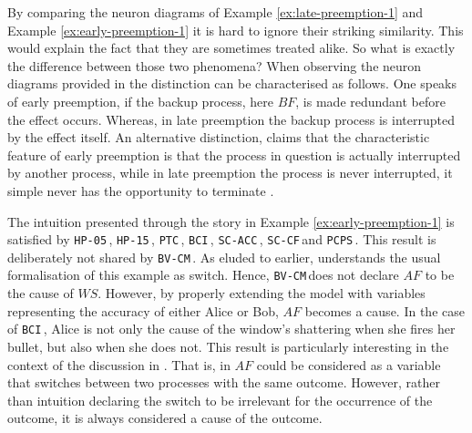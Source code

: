 \documentclass[11pt,a4paper]{book}
\theoremstyle{definition}
\theoremstyle{definition}
\theoremstyle{definition}
\theoremstyle{remark}
\newcommand{\hpu}{\texttt{HP-05}\,}
\newcommand{\ptc}{\texttt{PTC}\,}
\newcommand{\hpm}{\texttt{HP-15}\,}
\newcommand{\bvcm}{\texttt{BV-CM}\,}
\newcommand{\bci}{\texttt{BCI}\,}
\newcommand{\scacc}{\texttt{SC-ACC}\,}
\newcommand{\pcps}{\texttt{PCPS}\,}
\newcommand{\sccf}{\texttt{SC-CF}\,}
\begin{document}
By comparing the neuron diagrams of Example \ref{ex:late-preemption-1} and Example \ref{ex:early-preemption-1} it is hard to ignore their striking similarity.
This would explain the fact that they are sometimes treated alike. So what is exactly the difference between those two phenomena?
When observing the neuron diagrams provided in \parencite{baumgartner2013regularity} the distinction can be characterised as follows.
One speaks of early preemption, if the backup process, here $BF$, is made redundant before the effect occurs. Whereas, in late preemption the backup process is 
interrupted by the effect itself. 
An alternative distinction, claims that the characteristic feature of early preemption is that the process in question is actually interrupted by another process, while in late preemption the 
process is never interrupted, it simple never has the opportunity to terminate \parencite{baumgartner2013regularity}.


The intuition presented through the story in Example \ref{ex:early-preemption-1} is satisfied by \hpu, \hpm, \ptc, \bci, \scacc, \sccf and \pcps \parencite{bochman2018actual,denecker2018causal,weslake2015partial,batusov2018situation}.
This result is deliberately not shared by \bvcm.
As eluded to earlier, \parencite{beckers2018principled} understands the usual formalisation of this example as switch. Hence, \bvcm does not declare $AF$ to be the cause of $WS$.
However, by properly extending the model with variables representing the accuracy of either Alice or Bob, $AF$ becomes a cause.
In the case of \bci, Alice is not only the cause of the window's shattering when she fires her bullet, but also when she does not. This result is particularly interesting in the context of the discussion in \parencite{beckers2018principled}.
That is, in \parencite{bochman2018actual} $AF$ could be considered as a variable that switches between two processes with the same outcome. However, rather than intuition declaring the switch to be irrelevant for the occurrence of the outcome, it is always considered a cause of the outcome.





%
%
\end{document}
